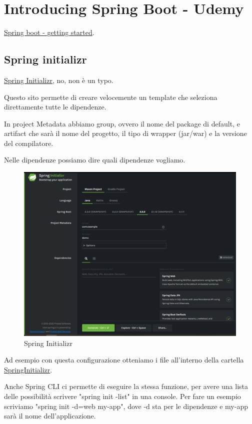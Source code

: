 \documentclass[11pt,a4paper]{book}
\begin{document}
\chapter{Introducing Spring Boot - Udemy}
\href{https://www.udemy.com/course/spring-boot-getting-started/}{Spring boot - getting started}.

\section{Spring initializr}
\href{https://start.spring.io/}{Spring Initializr}, no, non è un typo.

Questo sito permette di creare velocemente un template che seleziona direttamente tutte le dipendenze.

In project Metadata abbiamo group, ovvero il nome del package di default, e artifact che sarà il nome del progetto, il tipo di wrapper (jar/war) e la versione del compilatore.

Nelle dipendenze possiamo dire quali dipendenze vogliamo.
\begin{figure}[h!]
	\begin{center}
		\includegraphics[scale=0.6]{img/001.png}
		\caption{Spring Initializr}
		\label{fig: 001}
	\end{center}
\end{figure}
Ad esempio con questa configurazione otteniamo i file all'interno della cartella \href{Codici/SpringInitializr}{SpringInitializr}.

Anche Spring CLI ci permette di eseguire la stessa funzione, per avere una lista delle possibilità scrivere "spring init -list" in una console. Per fare un esempio scriviamo "spring init -d=web my-app", dove -d sta per le dipendenze e my-app sarà il nome dell'applicazione.
\end{document}
